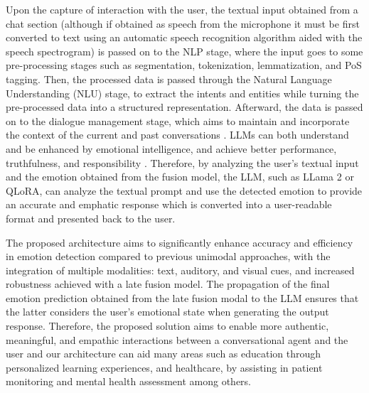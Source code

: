 \documentclass[runningheads]{llncs}
\begin{document}
Upon the capture of interaction with the user, the textual input obtained from a chat section (although if obtained as speech from the microphone it must be first converted to text using an automatic speech recognition algorithm aided with the speech spectrogram) is passed on to the NLP stage, where the input goes to some pre-processing stages such as segmentation, tokenization, lemmatization, and PoS tagging. Then, the processed data is passed through the Natural Language Understanding (NLU) stage, to extract the intents and entities while turning the pre-processed data into a structured representation. Afterward, the data is passed on to the dialogue management stage, which aims to maintain and incorporate the context of the current and past conversations \cite{rizou_multilingual_2022}. LLMs can both understand and be enhanced by emotional intelligence, and achieve better performance, truthfulness, and responsibility \cite{li_large_2023}. Therefore, by analyzing the user's textual input and the emotion obtained from the fusion model, the LLM, such as LLama 2 or QLoRA, can analyze the textual prompt and use the detected emotion to provide an accurate and emphatic response which is converted into a user-readable format and presented back to the user. 

The proposed architecture aims to significantly enhance accuracy and efficiency in emotion detection compared to previous unimodal approaches, with the integration of multiple modalities: text, auditory, and visual cues, and increased robustness achieved with a late fusion model. The propagation of the final emotion prediction obtained from the late fusion modal to the LLM ensures that the latter considers the user's emotional state when generating the output response.
Therefore, the proposed solution aims to enable more authentic, meaningful, and empathic interactions between a conversational agent and the user and our architecture can aid many areas such as education through personalized learning experiences, and healthcare, by assisting in patient monitoring and mental health assessment among others.

\end{document}
